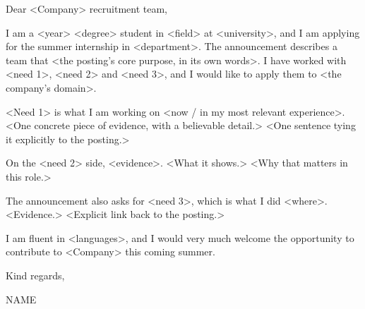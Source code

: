 \documentclass{coverletter}
\begin{document}


\subject{Application for Summer Internship <year> in <Department>}

Dear <Company> recruitment team,

I am a <year> <degree> student in <field> at <university>, and I am applying for the summer internship in <department>. The announcement describes a team that <the posting's core purpose, in its own words>. I have worked with <need 1>, <need 2> and <need 3>, and I would like to apply them to <the company's domain>.

<Need 1> is what I am working on <now / in my most relevant experience>. <One concrete piece of evidence, with a believable detail.> <One sentence tying it explicitly to the posting.>

On the <need 2> side, <evidence>. <What it shows.> <Why that matters in this role.>

The announcement also asks for <need 3>, which is what I did <where>. <Evidence.> <Explicit link back to the posting.>

I am fluent in <languages>, and I would very much welcome the opportunity to contribute to <Company> this coming summer.

\closing{Kind regards,}{{{NAME}}}
\end{document}
